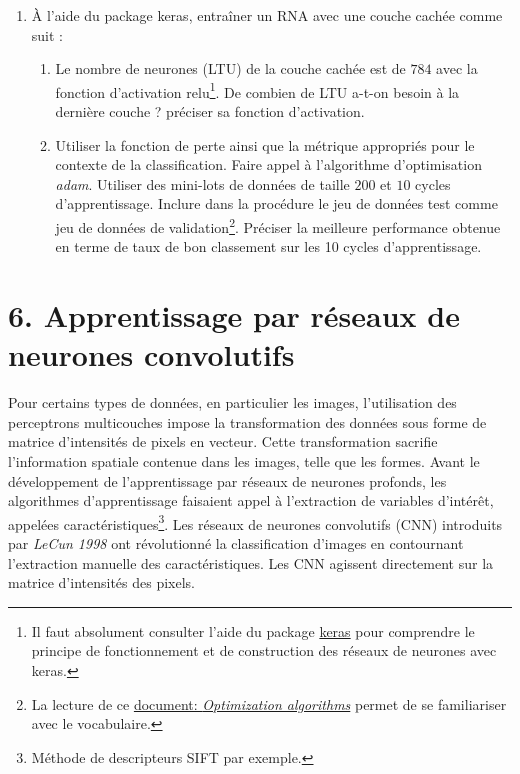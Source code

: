 \documentclass[11pt,]{article}
\begin{document}
\begin{enumerate}
\def\labelenumi{\arabic{enumi}.}
\setcounter{enumi}{3}
\item
  À l'aide du package \textsf{keras}, entraîner un RNA avec une couche
  cachée comme suit :

  \begin{enumerate}
  \def\labelenumii{\alph{enumii}.}
  \item
    Le nombre de neurones (LTU) de la couche cachée est de \(784\) avec
    la fonction d'activation \textsf{relu}\footnote{Il faut absolument
      consulter l'aide du package
      \href{https://keras.rstudio.com/}{\textsf{keras}} pour comprendre
      le principe de fonctionnement et de construction des réseaux de
      neurones avec \textsf{keras}.}. De combien de LTU a-t-on besoin à
    la dernière couche ? préciser sa fonction d'activation.
  \item
    Utiliser la fonction de perte ainsi que la métrique appropriés pour
    le contexte de la classification. Faire appel à l'algorithme
    d'optimisation \emph{adam}. Utiliser des mini-lots de données de
    taille \(200\) et \(10\) cycles d'apprentissage. Inclure dans la
    procédure le jeu de données test comme jeu de données de
    validation\footnote{La lecture de ce
      \href{https://www.math.univ-toulouse.fr/~besse/Wikistat/pdf/st-m-hdstat-rnn-deep-learning.pdf}{document:
      \emph{Optimization algorithms}} permet de se familiariser avec le
      vocabulaire.}. Préciser la meilleure performance obtenue en terme
    de taux de bon classement sur les 10 cycles d'apprentissage.
  \end{enumerate}
\end{enumerate}

\hypertarget{apprentissage-par-reseaux-de-neurones-convolutifs}{%
\section{6. Apprentissage par réseaux de neurones
convolutifs}\label{apprentissage-par-reseaux-de-neurones-convolutifs}}

Pour certains types de données, en particulier les images, l'utilisation
des perceptrons multicouches impose la transformation des données sous
forme de matrice d'intensités de pixels en vecteur. Cette transformation
sacrifie l'information spatiale contenue dans les images, telle que les
formes. Avant le développement de l'apprentissage par réseaux de
neurones profonds, les algorithmes d'apprentissage faisaient appel à
l'extraction de variables d'intérêt, appelées caractéristiques\footnote{Méthode
  de descripteurs SIFT par exemple.}. Les réseaux de neurones
convolutifs (CNN) introduits par \emph{LeCun 1998} ont révolutionné la
classification d'images en contournant l'extraction manuelle des
caractéristiques. Les CNN agissent directement sur la matrice
d'intensités des pixels.
\end{document}
